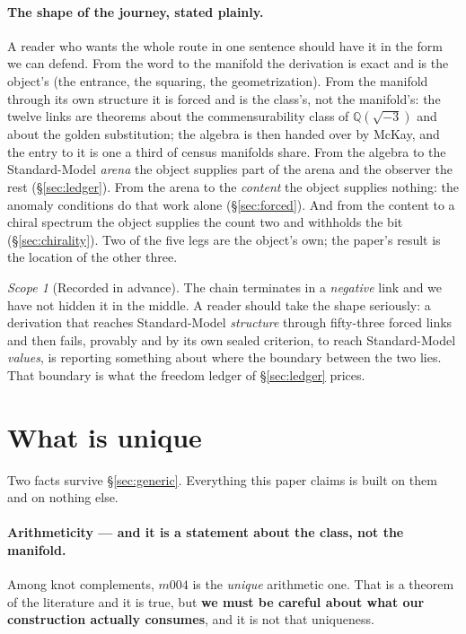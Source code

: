 \documentclass[11pt,a4paper]{article}
\theoremstyle{definition}
\theoremstyle{remark}
\newtheorem{scopenote}{Scope}
\newcommand{\Q}{\mathbb{Q}}
\begin{document}
\paragraph{The shape of the journey, stated plainly.} A reader who wants the whole route in one sentence should have it in
the form we can defend. From the word to the manifold the derivation is exact and is the object's (the entrance, the
squaring, the geometrization). From the manifold through its own structure it is forced and is the class's, not the manifold's: the twelve links are
theorems about the commensurability class of $\Q(\sqrt{-3})$ and about the golden substitution; the algebra is then handed
over by McKay, and the entry to it is one a third of census manifolds share. From the algebra to the Standard-Model \emph{arena} the object supplies
part of the arena and the observer the rest (\S\ref{sec:ledger}). From the arena to the \emph{content} the object
supplies nothing: the anomaly conditions do that work alone (\S\ref{sec:forced}). And from the content to a chiral
spectrum the object supplies the count two and withholds the bit (\S\ref{sec:chirality}). Two of the five legs are
the object's own; the paper's result is the location of the other three.

\begin{scopenote}[Recorded in advance]
The chain terminates in a \emph{negative} link and we have not hidden it in the middle. A reader
should take the shape seriously: a derivation that reaches Standard-Model \emph{structure} through
fifty-three forced links and then fails, provably and by its own sealed criterion, to reach
Standard-Model \emph{values}, is reporting something about where the boundary between the two lies.
That boundary is what the freedom ledger of \S\ref{sec:ledger} prices.
\end{scopenote}

\section{What is unique}\label{sec:unique}

Two facts survive \S\ref{sec:generic}. Everything this paper claims is built on them and on nothing
else.

\paragraph{Arithmeticity --- and it is a statement about the class, not the manifold.} Among knot
complements, $m004$ is the \emph{unique} arithmetic one. That is a theorem of the literature and it
is true, but \textbf{we must be careful about what our construction actually consumes}, and it is not
that uniqueness.
\end{document}
